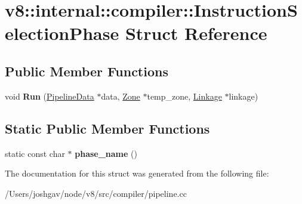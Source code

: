 \hypertarget{structv8_1_1internal_1_1compiler_1_1_instruction_selection_phase}{}\section{v8\+:\+:internal\+:\+:compiler\+:\+:Instruction\+Selection\+Phase Struct Reference}
\label{structv8_1_1internal_1_1compiler_1_1_instruction_selection_phase}
\subsection*{Public Member Functions}
\begin{DoxyCompactItemize}
\item 
void {\bfseries Run} (\hyperlink{classv8_1_1internal_1_1compiler_1_1_pipeline_data}{Pipeline\+Data} $\ast$data, \hyperlink{classv8_1_1internal_1_1_zone}{Zone} $\ast$temp\+\_\+zone, \hyperlink{classv8_1_1internal_1_1compiler_1_1_linkage}{Linkage} $\ast$linkage)\hypertarget{structv8_1_1internal_1_1compiler_1_1_instruction_selection_phase_a6b7b6b7aef09077907e768912f93468e}{}\label{structv8_1_1internal_1_1compiler_1_1_instruction_selection_phase_a6b7b6b7aef09077907e768912f93468e}

\end{DoxyCompactItemize}
\subsection*{Static Public Member Functions}
\begin{DoxyCompactItemize}
\item 
static const char $\ast$ {\bfseries phase\+\_\+name} ()\hypertarget{structv8_1_1internal_1_1compiler_1_1_instruction_selection_phase_ae8859718046a1f186456447dddf6c928}{}\label{structv8_1_1internal_1_1compiler_1_1_instruction_selection_phase_ae8859718046a1f186456447dddf6c928}

\end{DoxyCompactItemize}


The documentation for this struct was generated from the following file\+:\begin{DoxyCompactItemize}
\item 
/\+Users/joshgav/node/v8/src/compiler/pipeline.\+cc\end{DoxyCompactItemize}
